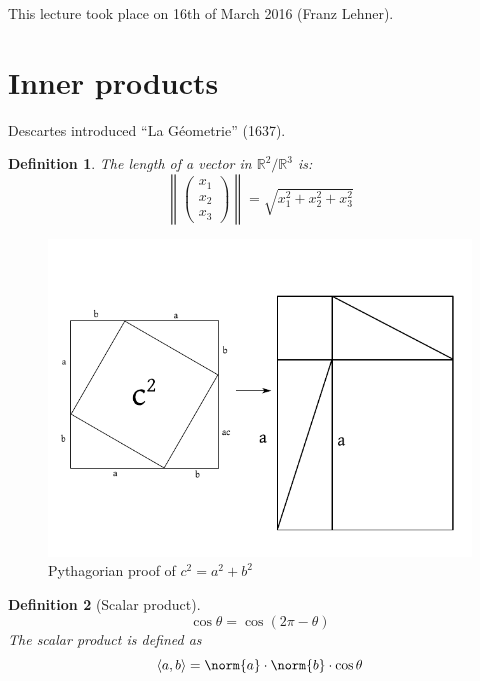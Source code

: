 \documentclass[a4paper,landscape,twocolumn]{article}
\newcommand\meta[3]{This #1 took place on #2 (#3).\par}
\newcommand\functional[1]{\left\langle{#1}\right\rangle}
\newtheorem{defi}{Definition}
\DeclarePairedDelimiter\norm\lVert\rVert
\begin{document}
\meta{lecture}{16th of March 2016}{Franz Lehner}

\section{Inner products}
%
Descartes introduced \enquote{La G\'eometrie} (1637).

\begin{defi}
  The length of a vector in $\mathbb R^2/\mathbb R^3$ is:
  \[ \left\| \begin{pmatrix} x_1 \\ x_2 \\ x_3 \end{pmatrix} \right\| = \sqrt{x_1^2 + x_2^2 + x_3^2} \]
\end{defi}

\begin{figure}[!h]
  \begin{center}
    \includegraphics{img/pythagorian-proof.pdf}
    \caption{Pythagorian proof of $c^2 = a^2 + b^2$}
    \label{img:pyth}
  \end{center}
\end{figure}

\begin{defi}[Scalar product]
  \[ \cos{\theta} = \cos(2\pi - \theta) \]
  The scalar product is defined as
  \[ \functional{a,b} = \norm{a} \cdot \norm{b} \cdot \cos{\theta} \]
\end{defi}
\end{document}
